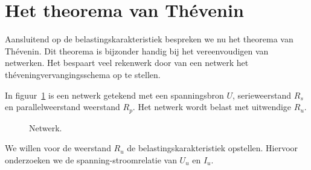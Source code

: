 \section{Het theorema van Th\'evenin}
Aansluitend op de belastingskarakteristiek bespreken we nu het theorema van Th\'evenin.
Dit theorema is bijzonder handig bij het vereenvoudigen van netwerken. Het bespaart veel
rekenwerk door van een netwerk het th\'eveningvervangingsschema op te stellen.

In figuur~\ref{fig:geltheveninbeginschema} is een netwerk getekend met een spanningsbron $U$,
serieweerstand $R_s$ en parallelweerstand weerstand $R_p$. Het netwerk wordt belast met uitwendige $R_u$.
%
\begin{figure}[!ht]
\centering
{}
\caption{Netwerk.}
\label{fig:geltheveninbeginschema}
\end{figure}
%
We willen voor de weerstand $R_u$ de belastingskarakteristiek opstellen. Hiervoor onderzoeken we de
spanning-stroomrelatie van $U_u$ en $I_u$.

